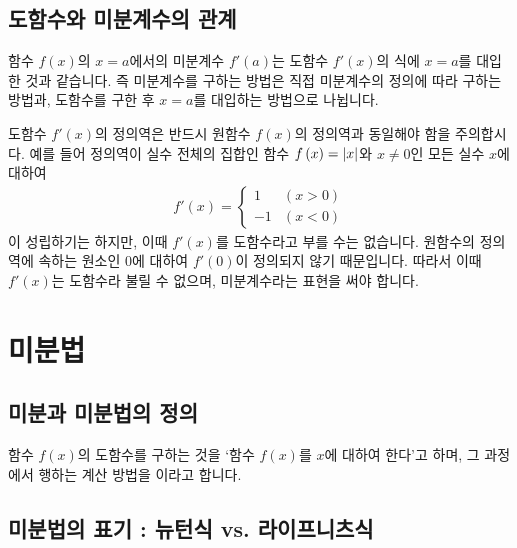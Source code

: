 \subsection{도함수와 미분계수의 관계}
함수 $f\left( x \right) $의 $x=a$에서의 미분계수 $f'\left( a \right) $는 도함수 $f'\left( x \right) $의 식에 $x=a$를 대입한 것과 같습니다. 즉 미분계수를 구하는 방법은 직접 미분계수의 정의에 따라 구하는 방법과, 도함수를 구한 후 $x=a$를 대입하는 방법으로 나뉩니다.

도함수 $f'\left( x \right) $의 정의역은 반드시 원함수 $f\left( x \right) $의 정의역과 동일해야 함을 주의합시다. 예를 들어 정의역이 실수 전체의 집합인 함수 $f\left( x \right) = \left|x\right|$와 $x \ne 0 $인 모든 실수 $x$에 대하여
\begin{align*} f'\left( x \right) = 
\begin{cases}
1 & \left( x > 0 \right) \\
-1 & \left( x < 0 \right) 
\end{cases}
\end{align*}
이 성립하기는 하지만, 이때 $f'\left( x \right) $를 도함수라고 부를 수는 없습니다. 원함수의 정의역에 속하는 원소인 $0$에 대하여 $f'\left( 0 \right) $이 정의되지 않기 때문입니다. 따라서 이때 $f'\left( x \right) $는 도함수라 불릴 수 없으며, 미분계수라는 표현을 써야 합니다.

\section{미분법}
\subsection{미분과 미분법의 정의}
함수 $f\left( x \right) $의 도함수를 구하는 것을 `함수 $f\left( x \right) $를 $x$에 대하여 한다'고 하며, 그 과정에서 행하는 계산 방법을 이라고 합니다.

\subsection{미분법의 표기 : 뉴턴식 vs. 라이프니츠식}

